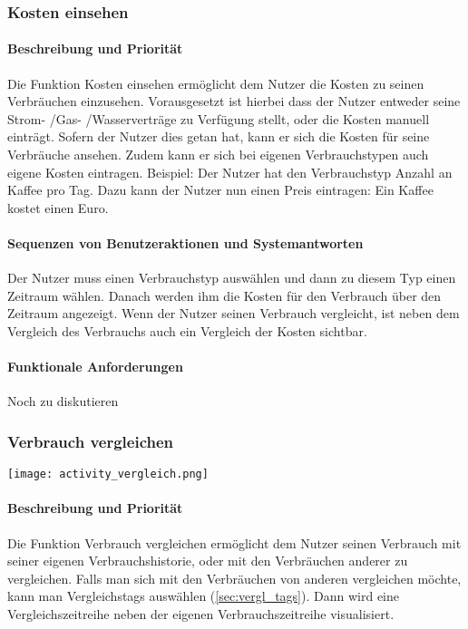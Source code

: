 \subsubsection{Kosten einsehen}
\paragraph{Beschreibung und Priorität}
Die Funktion Kosten einsehen ermöglicht dem Nutzer die Kosten zu seinen Verbräuchen einzusehen. Vorausgesetzt ist hierbei dass der Nutzer entweder seine Strom- /Gas- /Wasserverträge zu Verfügung stellt, oder die Kosten manuell einträgt. Sofern der Nutzer dies getan hat, kann er sich die Kosten für seine Verbräuche ansehen. Zudem kann er sich bei eigenen Verbrauchstypen auch eigene Kosten eintragen. Beispiel: Der Nutzer hat den Verbrauchstyp Anzahl an Kaffee pro Tag. Dazu kann der Nutzer nun einen Preis eintragen: Ein Kaffee kostet einen Euro.
\paragraph{Sequenzen von Benutzeraktionen und Systemantworten}
Der Nutzer muss einen Verbrauchstyp auswählen und dann zu diesem Typ einen Zeitraum wählen. Danach werden ihm die Kosten für den Verbrauch über den Zeitraum angezeigt. Wenn der Nutzer seinen Verbrauch vergleicht, ist neben dem Vergleich des Verbrauchs auch ein Vergleich der Kosten sichtbar.
\paragraph{Funktionale Anforderungen}
Noch zu diskutieren

\subsubsection{Verbrauch vergleichen}
\texttt{[image: activity\_vergleich.png]}
\paragraph{Beschreibung und Priorität}
Die Funktion Verbrauch vergleichen ermöglicht dem Nutzer seinen Verbrauch mit seiner eigenen Verbrauchshistorie, oder mit den Verbräuchen anderer zu vergleichen. Falls man sich mit den Verbräuchen von anderen vergleichen möchte, kann man Vergleichstags auswählen (\ref{sec:vergl_tags}). Dann wird eine Vergleichszeitreihe neben der eigenen Verbrauchszeitreihe visualisiert.
